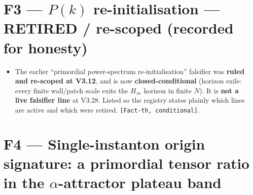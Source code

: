 \documentclass[11pt,a4paper]{article}
\newcommand{\st}[1]{\texttt{[#1]}}
\begin{document}
\section*{F3 --- $P(k)$ re-initialisation --- RETIRED / re-scoped (recorded for honesty)}
\begin{itemize}
\item The earlier ``primordial power-spectrum re-initialisation'' falsifier was \textbf{ruled and re-scoped at V3.12}, and is now \textbf{closed-conditional} (horizon exile: every finite wall/patch scale exits the $H_\infty$ horizon in finite $N$). It is \textbf{not a live falsifier line} at V3.28. Listed so the registry states plainly which lines are active and which were retired. \st{Fact-th, conditional}.
\end{itemize}

\section*{F4 --- Single-instanton origin signature: a primordial tensor ratio in the $\alpha$-attractor plateau band}
\end{document}
